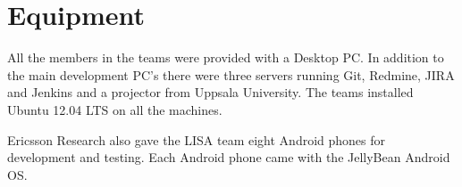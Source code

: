 \section{Equipment}

All the members in the teams were provided with a Desktop PC. In addition to the main development PC's there were three servers running Git, Redmine, JIRA and Jenkins and a projector from Uppsala University. The teams installed Ubuntu 12.04 LTS on all the machines.

Ericsson Research also gave the LISA team eight Android phones for development and testing. Each Android phone came with the JellyBean Android OS. 




